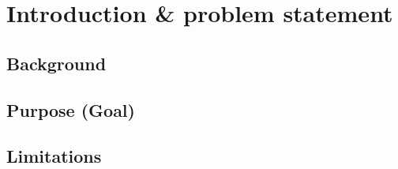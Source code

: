 \section{Introduction \& problem statement}


\subsection{Background}

\subsection{Purpose (Goal)}


\subsection{Limitations}


